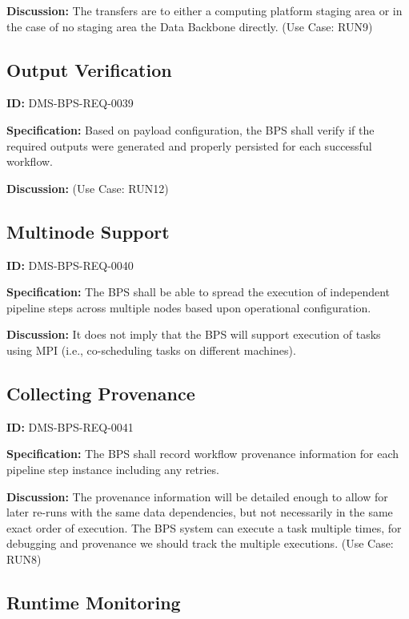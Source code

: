 \documentclass[SE,toc]{lsstdoc}
\begin{document}
\textbf{Discussion:}
The transfers are to either a computing platform staging area or in the case of no staging area the Data Backbone directly.  (Use Case: RUN9)

\subsection{Output Verification}

\label{DMS-BPS-REQ-0039}
\textbf{ID:} DMS-BPS-REQ-0039

\textbf{Specification:}
Based on payload configuration, the BPS shall verify if the required outputs were generated and properly persisted for each successful workflow.

\textbf{Discussion:}
(Use Case: RUN12)

\subsection{Multinode Support}

\label{DMS-BPS-REQ-0040}
\textbf{ID:} DMS-BPS-REQ-0040

\textbf{Specification:}
The BPS shall be able to spread the execution of independent pipeline steps across multiple nodes based upon operational configuration.

\textbf{Discussion:}
It does not imply that the BPS will support execution of tasks using MPI (i.e., co-scheduling tasks on different machines).

\subsection{Collecting Provenance}

\label{DMS-BPS-REQ-0041}
\textbf{ID:} DMS-BPS-REQ-0041

\textbf{Specification:}
The BPS shall record workflow provenance information for each pipeline step instance including any retries.

\textbf{Discussion:}
The provenance information will be detailed enough to allow for later re-runs with the same data dependencies, but not necessarily in the same exact order of execution.  The BPS system can execute a task multiple times, for debugging and provenance we should track the multiple executions.  (Use Case: RUN8)

\subsection{Runtime Monitoring}
\end{document}
